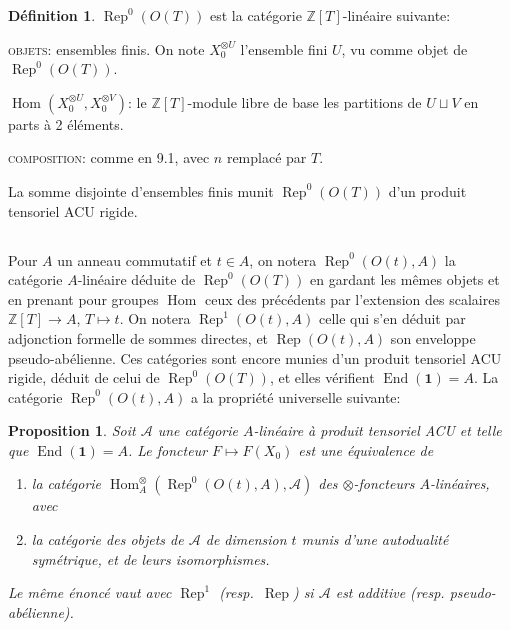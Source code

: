 \documentclass[11pt,a4paper]{article}
\theoremstyle{plain}
\newtheorem{proposition}[theorem]{Proposition}
\theoremstyle{definition}
\newtheorem{definition}[theorem]{D\'efinition}
\DeclareMathOperator{\Hom}{Hom}
\DeclareMathOperator{\End}{End}
\DeclareMathOperator{\Rep}{Rep}
\newcommand{\Z}{\mathbb{Z}}
\begin{document}
\begin{definition}
$\Rep^0(O(T))$ est la cat\'egorie $\Z[T]$-lin\'eaire suivante:

\textsc{objets}: ensembles finis. On note $X_0^{\otimes U}$ l'ensemble fini $U$, vu comme objet de $\Rep^0(O(T))$.

$\Hom(X_0^{\otimes U}, X_0^{\otimes V})$: le $\Z[T]$-module libre de base les partitions de $U \sqcup V$ en parts \`a 2 \'el\'ements.

\textsc{composition}: comme en 9.1, avec $n$ remplac\'e par $T$.

La somme disjointe d'ensembles finis munit $\Rep^0(O(T))$ d'un produit tensoriel ACU rigide.
\end{definition}

\subsection{}
Pour $A$ un anneau commutatif et $t \in A$, on notera $\Rep^0(O(t), A)$ la cat\'egorie $A$-lin\'eaire d\'eduite de $\Rep^0(O(T))$ en gardant les m\^emes objets et en prenant pour groupes $\Hom$ ceux des pr\'ec\'edents par l'extension des scalaires $\Z[T] \to A$, $T \mapsto t$. On notera $\Rep^1(O(t), A)$ celle qui s'en d\'eduit par adjonction formelle de sommes directes, et $\Rep(O(t), A)$ son enveloppe pseudo-ab\'elienne. Ces cat\'egories sont encore munies d'un produit tensoriel ACU rigide, d\'eduit de celui de $\Rep^0(O(T))$, et elles v\'erifient $\End(\mathbf{1}) = A$. La cat\'egorie $\Rep^0(O(t), A)$ a la propri\'et\'e universelle suivante:

\begin{proposition}
Soit $\mathcal{A}$ une cat\'egorie $A$-lin\'eaire \`a produit tensoriel ACU et telle que $\End(\mathbf{1}) = A$. Le foncteur $F \mapsto F(X_0)$ est une \'equivalence de
\begin{enumerate}[label=(\alph*)]
\item la cat\'egorie $\Hom^{\otimes}_A(\Rep^0(O(t), A), \mathcal{A})$ des $\otimes$-foncteurs $A$-lin\'eaires, avec
\item la cat\'egorie des objets de $\mathcal{A}$ de dimension $t$ munis d'une autodualit\'e sym\'etrique, et de leurs isomorphismes.
\end{enumerate}

Le m\^eme \'enonc\'e vaut avec $\Rep^1$ (resp.~$\Rep$) si $\mathcal{A}$ est additive (resp. pseudo-ab\'elienne).
\end{proposition}
\end{document}
